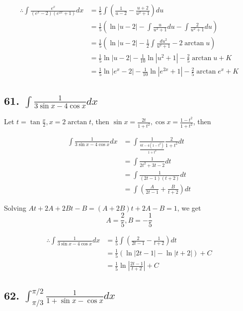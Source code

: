 \documentclass{article}
\begin{document}
    $$\begin{aligned}
        \therefore \int \frac{e^x}{(e^x - 2)(e^{2x} + 1)} dx &= \frac 1 5 \int(\frac{1}{u - 2} - \frac{u + 2 }{u^2 + 1}) du \\
        &= \frac 1 5(\ln|u - 2| - \int \frac{u}{u^2 + 1} du - \int \frac{2}{u^2 + 1} du) \\
        &= \frac 1 5(\ln|u - 2| - \frac 1 2 \int \frac{du^2}{u^2 + 1} - 2\arctan u) \\
        &= \frac 1 5\ln|u - 2| - \frac{1}{10} \ln|u^2 + 1| - \frac 2 5 \arctan u + K \\
        &= \frac 1 5 \ln|e^x - 2| - \frac{1}{10}\ln|e^{2x} + 1| - \frac 2 5 \arctan e^x + K
    \end{aligned}$$

    \subsection*{61. $\int \frac{1}{3\sin x - 4\cos x} dx$}

    Let $t = \tan \frac x 2, x = 2\arctan t$, then $\sin x = \frac{2t}{1 + t^2}, \cos x = \frac{1 - t^2}{1 + t^2}$, then

    $$\begin{aligned}
        \int \frac{1}{3\sin x - 4\cos x} dx &= \int \frac{1}{\frac{6t - 4(1 - t^2)}{1 + t^2}}\frac{2}{1 + t^2} dt  \\
        &= \int \frac{1}{2t^2 + 3t - 2}dt \\
        &= \int \frac{1}{(2t - 1)(t + 2)}dt \\
        &= \int (\frac{A}{2t - 1} + \frac{B}{t + 2}) dt
    \end{aligned}$$

    Solving $At + 2A + 2Bt - B = (A + 2B)t + 2A - B = 1$, we get $$A = \frac 2 5, B = -\frac 1 5$$

    $$\begin{aligned}
        \therefore \int \frac{1}{3\sin x - 4\cos x} dx &= \frac 1 5 \int(\frac{2}{2t - 1} - \frac{1}{t + 2}) dt \\
        &= \frac 1 5(\ln|2t - 1| - \ln|t + 2|) + C \\
        &= \frac 1 5 \ln|\frac{2t - 1}{t + 2}| + C
    \end{aligned}$$
    
    \subsection*{62. $\int_{\pi/3}^{\pi/2} \frac{1}{1 + \sin x - \cos x} dx$}
\end{document}
